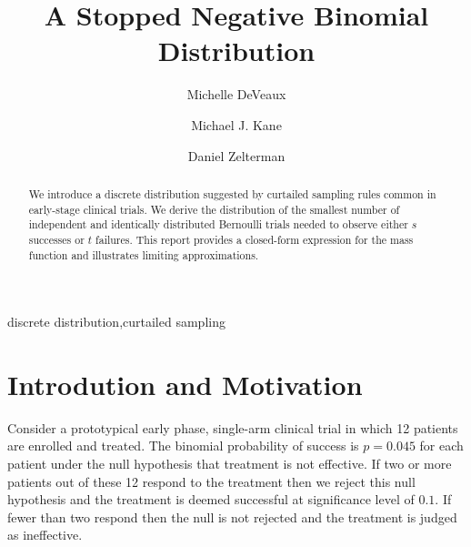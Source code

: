 \documentclass[review]{elsarticle}
\begin{document}
\begin{frontmatter}

\title{A Stopped Negative Binomial Distribution}


\author[mymainaddress]{Michelle DeVeaux}

\author[mymainaddress]{Michael J. Kane}

\author[mymainaddress]{Daniel Zelterman}

\address[mymainaddress]{Department of Biostatistics\\ School of Epidemiology and Public Health\\ Yale University, New Haven, CT}

\begin{abstract}
We introduce a discrete distribution suggested by curtailed
sampling rules common in early-stage clinical trials. We derive the
distribution of the smallest number of independent and identically
distributed Bernoulli trials needed to observe either $s$ successes 
or $t$ failures. This report provides a closed-form expression for the 
mass function and illustrates limiting approximations.
\end{abstract}

\begin{keyword}
discrete distribution\sep curtailed sampling
\end{keyword}

\end{frontmatter}

\linenumbers

\section{Introdution and Motivation}

Consider a prototypical early phase, single-arm clinical trial in which 
12 patients
are enrolled and treated. The binomial probability of success is $p=0.045$ for
each patient under the null hypothesis that treatment is not effective.
If two or more patients out of these 12 respond to the treatment then we 
reject this null
hypothesis and the treatment is deemed successful at significance 
level of $0.1$.  If fewer than two respond then the null is not rejected
and the treatment is judged as ineffective.
\end{document}
